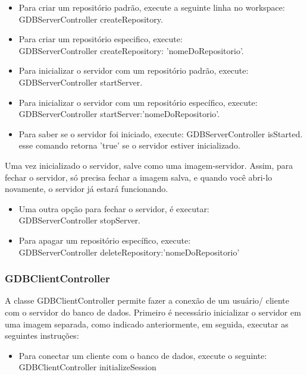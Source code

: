 \begin{itemize}
\item Para criar um repositório padrão, execute a seguinte linha no workspace:\\
{GDBServerController createRepository.}
\item Para criar um repositório especifico, execute:\\
{GDBServerController createRepository: 'nomeDoRepositorio'.}
\item Para inicializar o servidor com um repositório padrão, execute:\\
{GDBServerController startServer.}
\item Para inicializar o servidor com um repositório específico, execute:\\
{GDBServerController startServer:'nomeDoRepositorio'.}
\item{Para saber se o servidor foi iniciado, execute:}
{GDBServerController isStarted.}\\
esse comando retorna 'true' se o servidor estiver inicializado.
\end{itemize}

Uma vez inicializado o servidor, salve como uma imagem-servidor. Assim, para fechar o servidor, só precisa fechar a imagem salva, e quando você abri-lo novamente, o servidor já estará funcionando.

\begin{itemize}
\item Uma outra opção para fechar o servidor, é executar:\\
{GDBServerController stopServer.}
\item Para apagar um repositório específico, execute:\\
{GDBServerController deleteRepository:'nomeDoRepositorio'}
\end{itemize}


\subsubsection{GDBClientController}

A classe GDBClientController permite fazer a conexão de um usuário/ cliente com o servidor do banco de dados.
Primeiro é necessário inicializar o servidor em uma imagem separada, como indicado anteriormente, em seguida, executar as seguintes instruções:

\begin{itemize}
\item Para conectar um cliente com o banco de dados, execute o seguinte:\\
{GDBClientController initializeSession}
\end{itemize}

